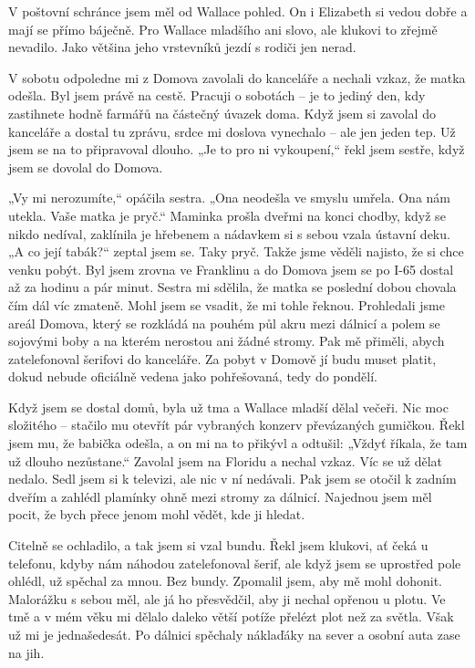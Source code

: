 V poštovní schránce jsem měl od Wallace pohled. On i Elizabeth si vedou dobře a mají se přímo báječně. Pro Wallace mladšího ani slovo, ale klukovi to zřejmě nevadilo. Jako většina jeho vrstevníků jezdí s rodiči jen nerad.

\bigskip

V sobotu odpoledne mi z Domova zavolali do kanceláře a nechali vzkaz, že matka odešla. Byl jsem právě na cestě. Pracuji o sobotách – je to jediný den, kdy zastihnete hodně farmářů na částečný úvazek doma. Když jsem si zavolal do kanceláře a dostal tu zprávu, srdce mi doslova vynechalo – ale jen jeden tep. Už jsem se na to připravoval dlouho. „Je to pro ni vykoupení,“ řekl jsem sestře, když jsem se dovolal do Domova.

„Vy mi nerozumíte,“ opáčila sestra. „Ona  neodešla  ve smyslu umřela. Ona nám  utekla.  Vaše matka je pryč.“ Maminka prošla dveřmi na konci chodby, když se nikdo nedíval, zaklínila je hřebenem a nádavkem si s sebou vzala ústavní deku. „A co její tabák?“ zeptal jsem se. Taky pryč. Takže jsme věděli najisto, že si chce venku pobýt. Byl jsem zrovna ve Franklinu a do Domova jsem se po I-65 dostal až za hodinu a pár minut. Sestra mi sdělila, že matka se poslední dobou chovala čím dál víc zmateně. Mohl jsem se vsadit, že mi tohle řeknou. Prohledali jsme areál Domova, který se rozkládá na pouhém půl akru mezi dálnicí a polem se sojovými boby a na kterém nerostou ani žádné stromy. Pak mě přiměli, abych zatelefonoval šerifovi do kanceláře. Za pobyt v Domově jí budu muset platit, dokud nebude oficiálně vedena jako pohřešovaná, tedy do pondělí.

Když jsem se dostal domů, byla už tma a Wallace mladší dělal večeři. Nic moc složitého – stačilo mu otevřít pár vybraných konzerv převázaných gumičkou. Řekl jsem mu, že babička odešla, a on mi na to přikývl a odtušil: „Vždyť říkala, že tam už dlouho nezůstane.“ Zavolal jsem na Floridu a nechal vzkaz. Víc se už dělat nedalo. Sedl jsem si k televizi, ale nic v ní nedávali. Pak jsem se otočil k zadním dveřím a zahlédl plamínky ohně mezi stromy za dálnicí. Najednou jsem měl pocit, že bych přece jenom mohl vědět, kde ji hledat.

\bigskip

Citelně se ochladilo, a tak jsem si vzal bundu. Řekl jsem klukovi, ať čeká u telefonu, kdyby nám náhodou zatelefonoval šerif, ale když jsem se uprostřed pole ohlédl, už spěchal za mnou. Bez bundy. Zpomalil jsem, aby mě mohl dohonit. Malorážku s sebou měl, ale já ho přesvědčil, aby ji nechal opřenou u plotu. Ve tmě a v mém věku mi dělalo daleko větší potíže přelézt plot než za světla. Však už mi je jednašedesát. Po dálnici spěchaly náklaďáky na sever a osobní auta zase na jih.


